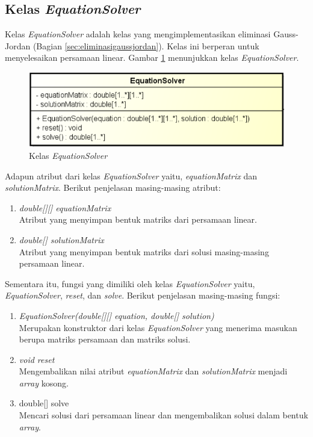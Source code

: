 \subsection{Kelas \textit{EquationSolver}}

Kelas \textit{EquationSolver} adalah kelas yang mengimplementasikan eliminasi Gauss-Jordan (Bagian \ref{sec:eliminasigaussjordan}). Kelas ini berperan untuk menyelesaikan persamaan linear. Gambar \ref{fig:classequationsolver} menunjukkan kelas \textit{EquationSolver}.

\begin{figure}[H]
	\centering
	\includegraphics[scale=0.7]{Gambar/class_equation_solver}
	\caption{Kelas \textit{EquationSolver}}\label{fig:classequationsolver}
\end{figure}

Adapun atribut dari kelas \textit{EquationSolver} yaitu, \textit{equationMatrix} dan \textit{solutionMatrix}. Berikut penjelasan masing-masing atribut:

\begin{enumerate}
	\item \textit{double[][] equationMatrix} \\
	Atribut yang menyimpan bentuk matriks dari persamaan linear.
	\item \textit{double[] solutionMatrix} \\
	Atribut yang menyimpan bentuk matriks dari solusi masing-masing persamaan linear.
\end{enumerate}

Sementara itu, fungsi yang dimiliki oleh kelas \textit{EquationSolver} yaitu, \textit{EquationSolver}, \textit{reset}, dan \textit{solve}. Berikut penjelasan masing-masing fungsi:

\begin{enumerate}
	\item \textit{EquationSolver(double[][] equation, double[] solution)} \\
	Merupakan konstruktor dari kelas \textit{EquationSolver} yang menerima masukan berupa matriks persamaan dan matriks solusi.
	\item \textit{void reset} \\
	Mengembalikan nilai atribut \textit{equationMatrix} dan \textit{solutionMatrix} menjadi \textit{array} kosong.
	\item double[] solve \\
	Mencari solusi dari persamaan linear dan mengembalikan solusi dalam bentuk \textit{array}.
\end{enumerate}

